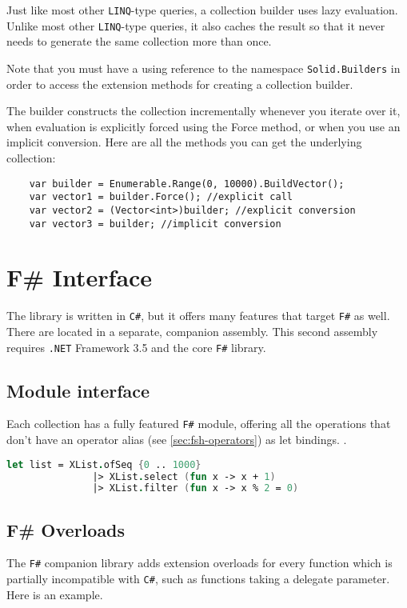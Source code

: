 \documentclass[]{article}
\newcommand{\codeformat}{\ttfamily}
\newcommand{\keywordformat}{\codeformat\color{blue}}
\newcommand{\keyword}[1]{{\keywordformat #1}}
\newcommand{\code}[1]{\mbox{\texttt{#1}}}
\newcommand{\dotnet}{\texttt{.NET}\xspace}
\newcommand{\linq}{\texttt{LINQ}\xspace}
\newcommand{\fsh}{\texttt{F\#}\xspace}
\newcommand{\csh}{\texttt{C\#}\xspace}
\begin{document}
Just like most other \linq-type queries, a collection builder uses lazy evaluation. Unlike most other \linq-type queries, it also caches the result so that it never needs to generate the same collection more than once.

Note that you must have a \keyword{using} reference to the namespace \code{Solid.Builders} in order to access the extension methods for creating a collection builder.

The builder constructs the collection incrementally whenever you iterate over it, when evaluation is explicitly forced using the Force method, or when you use an implicit conversion. Here are all the methods you can get the underlying collection:

\begin{lstlisting}
	var builder = Enumerable.Range(0, 10000).BuildVector();
	var vector1 = builder.Force(); //explicit call
	var vector2 = (Vector<int>)builder; //explicit conversion
	var vector3 = builder; //implicit conversion
\end{lstlisting}

\section{F\# Interface}\label{sec:fsharp}
The library is written in \csh, but it offers many features that target \fsh as well. There are located in a separate, companion assembly. This second assembly requires \dotnet Framework 3.5 and the core \fsh library.

\subsection{Module interface}\label{sec:fsh-module}
Each collection has a fully featured \fsh module, offering all the operations that don't have an operator alias (see \cref{sec:fsh-operators}) as \keyword{let} bindings. . 

\begin{lstlisting}[language=fsharp]
	let list = XList.ofSeq {0 .. 1000} 
			   |> XList.select (fun x -> x + 1)
			   |> XList.filter (fun x -> x % 2 = 0)
\end{lstlisting}

\subsection{F\# Overloads}\label{sec:fsh-overloads}
The \fsh companion library adds extension overloads for every function which is partially incompatible with \csh, such as functions taking a delegate parameter. Here is an example.
\end{document}
